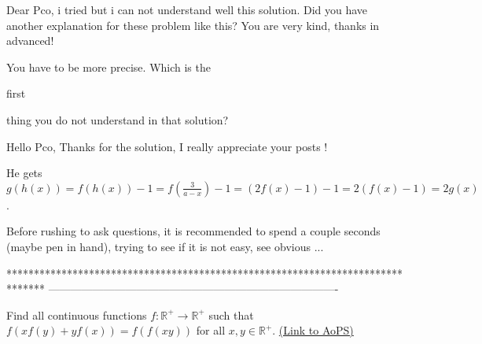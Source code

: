 \begin{solution}

Dear Pco, i tried but i can not understand well this solution. Did you have another explanation for these problem like this? 
You are very kind, thanks in advanced!
\end{solution}



\begin{solution}
	You have to be more precise. Which is the\begin{bolded} first \end{bolded}thing you do not understand in that solution?
\end{solution}



\begin{solution}
	Hello Pco,
Thanks for the solution, I really appreciate your posts !
\end{solution}



\begin{solution}
	He gets $g(h(x)) = f(h(x)) - 1 = f\left(\frac 3{a-x}\right) - 1 = (2f(x)-1) - 1 = 2(f(x) - 1) = 2g(x)$.

Before rushing to ask questions, it is recommended to spend a couple seconds (maybe pen in hand), trying to see if it is not easy, see obvious ...
\end{solution}
*******************************************************************************
-------------------------------------------------------------------------------

\begin{problem}
	Find all continuous functions $f: \mathbb{R^+} \to \mathbb{R}^+$ such that $f(xf(y)+yf(x))=f(f(xy))$ for all $x,y \in \mathbb{R^+}$.
	\flushright \href{https://artofproblemsolving.com/community/c6h476675}{(Link to AoPS)}
\end{problem}




